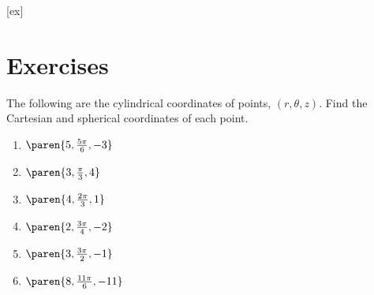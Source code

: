 [ex]
\section*{Exercises}


\begin{ex} The following are the cylindrical coordinates of points, $(
r,\theta,z)$. Find the Cartesian and spherical coordinates of each point.

\begin{enumerate}
\item $\paren{5,\frac{5\pi }{6},-3} $

\item $\paren{3,\frac{\pi }{3},4} $

\item $\paren{4,\frac{2\pi }{3},1} $

\item $\paren{2,\frac{3\pi }{4},-2} $

\item $\paren{3,\frac{3\pi }{2},-1} $

\item $\paren{8,\frac{11\pi }{6},-11} $
\end{enumerate}
\end{ex}

